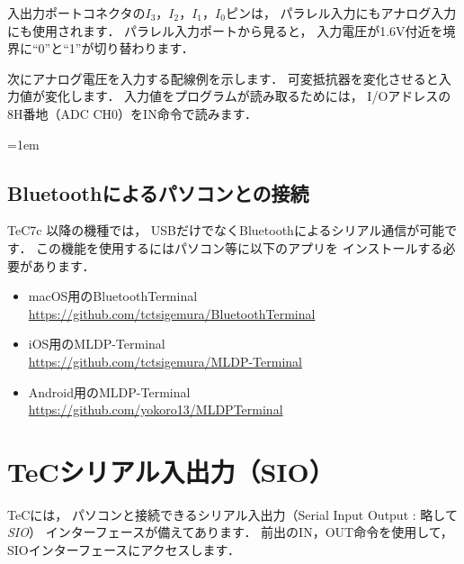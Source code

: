入出力ポートコネクタの$I_3$，$I_2$，$I_1$，$I_0$ピンは，
パラレル入力にもアナログ入力にも使用されます．
パラレル入力ポートから見ると，
入力電圧が1.6V付近を境界に``0''と``1''が切り替わります．

次にアナログ電圧を入力する配線例を示します．
可変抵抗器を変化させると入力値が変化します．
入力値をプログラムが読み取るためには，
I/Oアドレスの8H番地（ADC CH0）をIN命令で読みます．

\begin{center}
\end{center}

\begin{framed}{\parindent=1em
  \subsection*{Bluetoothによるパソコンとの接続}
  {\small TeC7c 以降の機種では，
    USBだけでなくBluetoothによるシリアル通信が可能です．
    この機能を使用するにはパソコン等に以下のアプリを
    インストールする必要があります．

    \begin{itemize}
    \item macOS用のBluetoothTerminal\label{BluetoothTerminal} \\
      \url{https://github.com/tctsigemura/BluetoothTerminal}
    \item iOS用のMLDP-Terminal \\
      \url{https://github.com/tctsigemura/MLDP-Terminal}
    \item Android用のMLDP-Terminal \\
      \url{https://github.com/yokoro13/MLDPTerminal}
    \end{itemize}
  }
}\end{framed}

\newpage
\section{TeCシリアル入出力（SIO）}
\label{sio}
TeCには，
パソコンと接続できるシリアル入出力（Serial Input Output : 略して \emph{SIO}）
インターフェースが備えてあります．
前出のIN，OUT命令を使用して，
SIOインターフェースにアクセスします．

